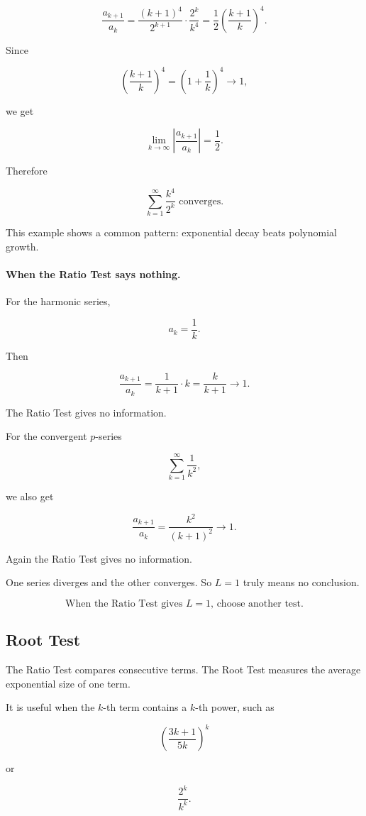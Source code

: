 \[
\frac{a_{k+1}}{a_k}
=
\frac{(k+1)^4}{2^{k+1}}\cdot\frac{2^k}{k^4}
=
\frac12\left(\frac{k+1}{k}\right)^4.
\]

Since

\[
\left(\frac{k+1}{k}\right)^4
=
\left(1+\frac1k\right)^4\to1,
\]

we get

\[
\lim_{k\to\infty}\left|\frac{a_{k+1}}{a_k}\right|
=
\frac12.
\]

Therefore

\[
\boxed{
\sum_{k=1}^{\infty}\frac{k^4}{2^k}
\text{ converges.}
}
\]

This example shows a common pattern: exponential decay beats polynomial growth.

\paragraph{When the Ratio Test says nothing.}
For the harmonic series,

\[
a_k=\frac1k.
\]

Then

\[
\frac{a_{k+1}}{a_k}
=
\frac{1}{k+1}\cdot k
=
\frac{k}{k+1}
\to1.
\]

The Ratio Test gives no information.

For the convergent \(p\)-series

\[
\sum_{k=1}^{\infty}\frac1{k^2},
\]

we also get

\[
\frac{a_{k+1}}{a_k}
=
\frac{k^2}{(k+1)^2}
\to1.
\]

Again the Ratio Test gives no information.

One series diverges and the other converges.  So \(L=1\) truly means no conclusion.

\[
\boxed{
\text{When the Ratio Test gives \(L=1\), choose another test.}
}
\]

\subsection{Root Test}
\label{subsec:root-test}

The Ratio Test compares consecutive terms.  The Root Test measures the average
exponential size of one term.

It is useful when the \(k\)-th term contains a \(k\)-th power, such as

\[
\left(\frac{3k+1}{5k}\right)^k
\]

or

\[
\frac{2^k}{k^k}.
\]

